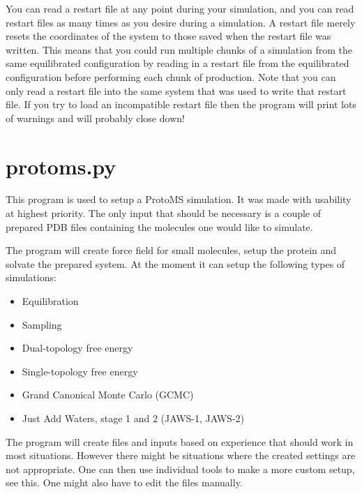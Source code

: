 \documentclass[letterpaper,10pt,english]{sphinxmanual}
\begin{document}
You can read a restart file at any point during your simulation, and you can read restart files as many times as you desire during a simulation. A restart file merely resets the coordinates of the system to those saved when the restart file was written. This means that you could run multiple chunks of a simulation from the same equilibrated configuration by reading in a restart file from the equilibrated configuration before performing each chunk of production. Note that you can only read a restart file into the same system that was used to write that restart file. If you try to load an incompatible restart file then the program will print lots of warnings and will probably close down!


\chapter{protoms.py}
\label{protomspy:protoms-py}\label{protomspy::doc}
This program is used to setup a ProtoMS simulation. It was made with usability at highest priority. The only input that should be necessary is a couple of prepared PDB files containing the molecules one would like to simulate.

The program will create force field for small molecules, setup the protein and solvate the prepared system. At the moment it can setup the following types of simulations:
\begin{itemize}
\item {} 
Equilibration

\item {} 
Sampling

\item {} 
Dual-topology free energy

\item {} 
Single-topology free energy

\item {} 
Grand Canonical Monte Carlo (GCMC)

\item {} 
Just Add Waters, stage 1 and 2 (JAWS-1, JAWS-2)

\end{itemize}

The program will create files and inputs based on experience that should work in most situations. However there might be situations where the created settings are not appropriate. One can then use individual tools to make a more custom setup, see this. One might also have to edit the files manually.
\end{document}
